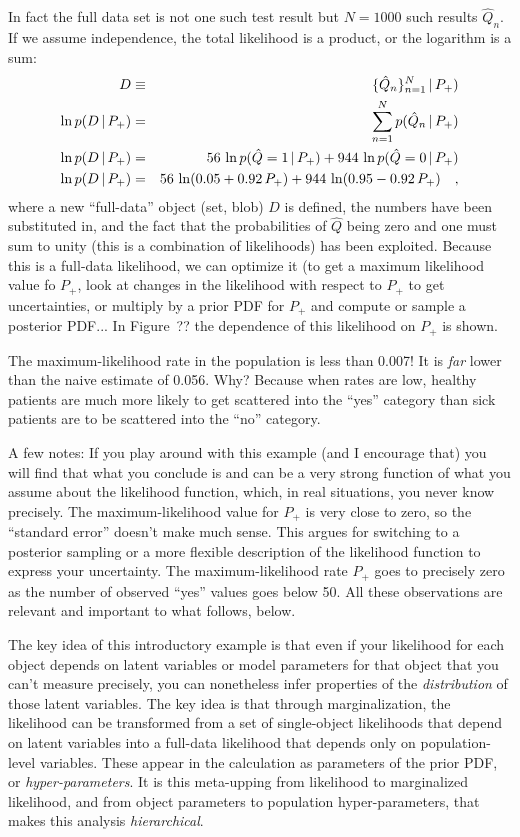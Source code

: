 \documentclass[12pt,twoside]{article}
\begin{document}
In fact the full data set is not one such test result but $N=1000$
such results $\hat{Q}_n$.  If we assume independence, the total
likelihood is a product, or the logarithm is a sum:
\begin{eqnarray}
D &\equiv& \{{\hat{Q}_n}\}_{{n=1}}^{{N}}\,|\, P_+) 
\\
\ln p(D\,|\, P_+) 
 &=& \sum_{n=1}^N p(\hat{Q}_n\,|\, P_+)
\\
\ln p(D\,|\, P_+) 
 &=& 56\,\ln p(\hat{Q}=1\,|\, P_+) + 944\,\ln p(\hat{Q}=0\,|\, P_+)
\\
\ln p(D\,|\, P_+) 
 &=& 56\,\ln (0.05 + 0.92\,P_+) + 944\,\ln (0.95 - 0.92\,P_+)
\quad,
\end{eqnarray}
where a new ``full-data'' object (set, blob) $D$ is defined, the
numbers have been substituted in, and the fact that the probabilities
of $\hat{Q}$ being zero and one must sum to unity (this is a
combination of likelihoods) has been exploited.  Because this is a
full-data likelihood, we can optimize it (to get a maximum likelihood
value fo $P_+$, look at changes in the likelihood with respect to
$P_+$ to get uncertainties, or multiply by a prior PDF for $P_+$ and
compute or sample a posterior PDF... In Figure~?? the dependence of
this likelihood on $P_+$ is shown.

The maximum-likelihood rate in the population is less than 0.007!  It
is \emph{far} lower than the naive estimate of 0.056.  Why?  Because
when rates are low, healthy patients are much more likely to get
scattered into the ``yes'' category than sick patients are to be
scattered into the ``no'' category.

A few notes: If you play around with this example (and I encourage
that) you will find that what you conclude is and can be a very strong
function of what you assume about the likelihood function, which, in
real situations, you never know precisely.  The
maximum-likelihood value for $P_+$ is very close to zero, so the
``standard error'' doesn't make much sense.  This argues for switching
to a posterior sampling or a more flexible description of the
likelihood function to express your uncertainty.  The
maximum-likelihood rate $P_+$ goes to precisely zero as the number of
observed ``yes'' values goes below 50.  All these observations are
relevant and important to what follows, below.

The key idea of this introductory example is that even if your
likelihood for each object depends on latent variables or model
parameters for that object that you can't measure precisely, you can
nonetheless infer properties of the \emph{distribution} of those
latent variables.  The key idea is that through marginalization, the
likelihood can be transformed from a set of single-object likelihoods
that depend on latent variables into a full-data likelihood that
depends only on population-level variables.  These appear in the
calculation as parameters of the prior PDF, or
\emph{hyper-parameters}.  It is this meta-upping from likelihood to
marginalized likelihood, and from object parameters to population
hyper-parameters, that makes this analysis \emph{hierarchical}.
\end{document}

